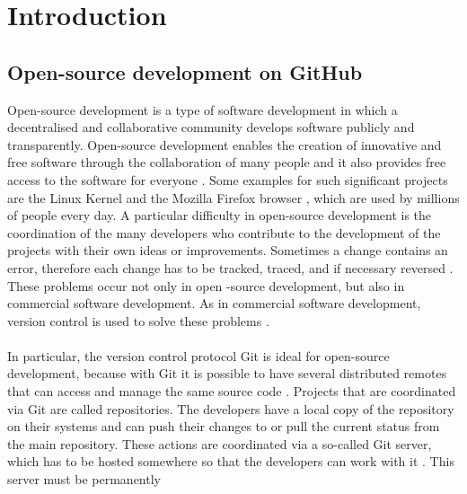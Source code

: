 \documentclass[sigconf]{acmart}
\begin{document}
\maketitle
\pagestyle{plain}


\section{Introduction}
\subsection{Open-source development on GitHub}
Open-source development is a type of software development in which a decentralised and collaborative 
community develops software publicly and transparently. Open-source development enables the creation 
of innovative and free software through the collaboration of many people and it also provides free access 
to the software for everyone \cite{shaikh2017governing, redhat2021ops}. Some examples for such significant 
projects are the Linux Kernel \cite{linux2021ops} and the Mozilla Firefox browser \cite{mozilla2021ops}, which are 
used by millions of people every day. A particular difficulty in open-source development is the coordination of the many 
developers who contribute to the development of the projects with their own ideas or improvements. Sometimes a 
change contains an error, therefore each change has
to be tracked, traced, and if necessary reversed   \cite{shaikh2017governing}. These problems occur not only in open 
-source development, but also in commercial software development. As in commercial software development, version control is 
used to solve these problems \cite{shaikh2017governing, ulrich2020dev}. \\ \\
In particular, the version control protocol Git 
is ideal for open-source development, because with Git it is possible to have several distributed remotes that can 
access and manage the same source code \cite{git2021scm, ulrich2020dev}. Projects that are coordinated via Git are 
called repositories. The developers have a local copy of the repository on their systems and can push their changes to or 
pull the current status from the main repository. These actions are coordinated via a so-called Git server, which has to be 
hosted somewhere so that the developers can work with it \cite{git2021scm}. This server must be permanently
\end{document}
